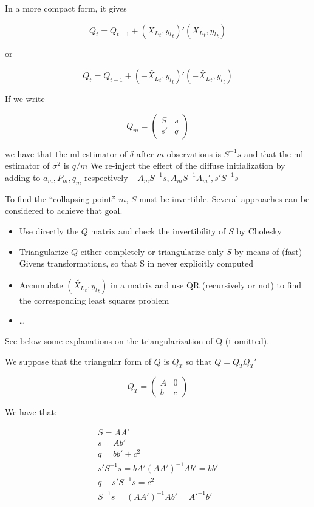 \documentclass[
  letterpaper,
  DIV=11,
  numbers=noendperiod]{scrreprt}
\providecommand{\tightlist}{%
  \setlength{\itemsep}{0pt}\setlength{\parskip}{0pt}}
\begin{document}
In a more compact form, it gives

\[
Q_t = Q_{t-1} + ( {X_L}_t, {y_l}_t)'( {X_L}_t, {y_l}_t)
\]

or

\[
Q_t = Q_{t-1} + (-\tilde {X_L}_t, {y_l}_t)'(-\tilde {X_L}_t, {y_l}_t)
\]

If we write

\[
Q_m = 
\begin{pmatrix}
S & s \\
s' & q
\end{pmatrix}
\]

we have that the ml estimator of \(\delta\) after \(m\) observations is
\(S^{-1}s\) and that the ml estimator of \(\sigma^2\) is \(q/m\) We
re-inject the effect of the diffuse initialization by adding to
\(a_m, P_m, q_m\) respectively
\(-A_m S^{-1}s, A_m S^{-1} A_m', s' S^{-1} s\)

To find the ``collapsing point'' \(m\), \(S\) must be invertible.
Several approaches can be considered to achieve that goal.

\begin{itemize}
\tightlist
\item
  Use directly the \(Q\) matrix and check the invertibility of \(S\) by
  Cholesky
\item
  Triangularize \(Q\) either completely or triangularize only \(S\) by
  means of (fast) Givens transformations, so that S in never explicitly
  computed
\item
  Accumulate \((\tilde {X_L}_t, {y_l}_t)\) in a matrix and use QR
  (recursively or not) to find the corresponding least squares problem
\item
  \ldots{}
\end{itemize}

See below some explanations on the triangularization of Q (t omitted).

We suppose that the triangular form of \(Q\) is \(Q_T\) so that
\(Q = Q_T Q_T'\)

\[
Q_T=\begin{pmatrix}
A & 0 \\
b & c
\end{pmatrix}
\]

We have that:

\[
\begin{align*}
S = AA' \\
s = A b' \\
q=b b' + c^2 \\
s' S^{-1} s = b A' (AA')^{-1} A b' = b b' \\
q - s' S^{-1} s = c^2 \\
S^{-1} s = (AA')^{-1} A b' = A'^{-1}b'
\end{align*}
\]
\end{document}
